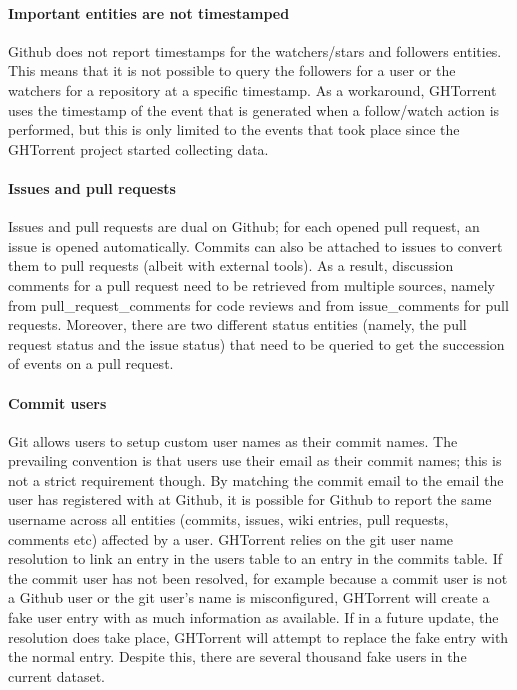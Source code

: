\documentclass[conference]{IEEEtran}
\begin{document}
\paragraph*{Important entities are not timestamped}
\label{chal:timestamp}
Github does not report
    timestamps for the watchers/stars and followers entities. This means that it
    is not possible to query the followers for a user or the watchers for a
    repository at a specific timestamp. As a workaround, GHTorrent uses the
    timestamp of the event that is generated when a follow/watch action is
    performed, but this is only limited to the events that took place since
    the GHTorrent project started collecting data.


\paragraph*{Issues and pull requests} Issues and pull requests are dual on
Github; for each opened pull request, an issue is opened automatically.  Commits
can also be attached to issues to convert them to pull requests (albeit with
external tools). As a result, discussion comments for a pull request need to be
retrieved from multiple sources, namely from {\sf pull\_request\_comments} for
code reviews and from {\sf issue\_comments} for pull requests. Moreover, there
are two different status entities (namely, the pull request status and the issue
status) that need to be queried to get the succession of events on a pull
request.

\paragraph*{Commit users} Git allows users to setup custom user names as
    their commit names. The prevailing convention is that users use their email
    as their commit names; this is not a strict requirement though. By matching
    the commit email to the email the user has registered with at Github, it is
    possible for Github to report the same username across all entities
    (commits, issues, wiki entries, pull requests, comments etc) affected by a
    user. GHTorrent relies on the git user name resolution to link an entry in
    the \textsf{users} table to an entry in the \textsf{commits} table. If the
    commit user has not been resolved, for example because a commit user is not
    a Github user or the git user's name is misconfigured, GHTorrent will create
    a fake user entry with as much information as available. If in a future
    update, the resolution does take place, GHTorrent will attempt to replace
    the fake entry with the normal entry. Despite this, there are several
    thousand fake users in the current dataset.
    
\end{document}
